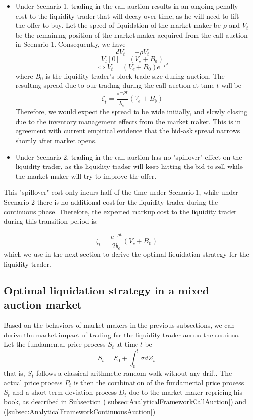 \begin{itemize}
  \item Under Scenario 1, trading in the call auction results in an ongoing penalty cost to the liquidity trader that will decay over time, as he will need to lift the offer to buy. Let the speed of liquidation of the market maker be $\rho$ and $V_t$ be the remaining position of the market maker acquired from the call auction in Scenario 1. Consequently, we have
        \[
          dV_t = -\rho V_t
        \]
        \[
          V_t[0]=(V_e + B_0)
        \]
        \begin{equation}\label{eqn:recovery_term_eqb}
          \Leftrightarrow V_t = (V_e + B_0) e^{-\rho t}
        \end{equation}
        where $B_0$ is the liquidity trader's block trade size during auction. The resulting spread due to our trading during the call auction at time $t$ will be
        \[
          \zeta_t = \frac{e^{-\rho t}}{b_e}  (V_e + B_0)
        \]
        Therefore, we would expect the spread to be wide initially, and slowly closing due to the inventory management effects from the market maker. This is in agreement with current empirical evidence that the bid-ask spread narrows shortly after market opens.
  \item Under Scenario 2, trading in the call auction has no "spillover" effect on the liquidity trader, as the liquidity trader will keep hitting the bid to sell while the market maker will try to improve the offer.
\end{itemize}

This "spillover" cost only incurs half of the time under Scenario 1, while under Scenario 2 there is no additional cost for the liquidity trader during the continuous phase. Therefore, the expected markup cost to the liquidity trader during this transition period is:

\begin{equation}\label{resilence_term}
  \zeta_t = \frac{e^{-\rho t}}{2 b_e}  (V_e + B_0)
\end{equation}
which we use in the next section to derive the optimal liquidation strategy for the liquidity trader.

\subsection{Optimal liquidation strategy in a mixed auction market}

Based on the behaviors of market makers in the previous subsections, we can derive the market impact of trading for the liquidity trader across the sessions. Let the fundamental price process $S_t$ at time $t$ be
\[
  S_t = S_0 + \int_0^t \sigma dZ_s
\]
that is, $S_t$ follows a classical arithmetic random walk without any drift. The actual price process $P_t$ is then the combination of the fundamental price process $S_t$ and a short term deviation process $D_t$ due to the market maker repricing his book, as described in Subsection (\ref{subsec:AnalyticalFrameworkCallAuction}) and (\ref{subsec:AnalyticalFrameworkContinuousAuction}):

